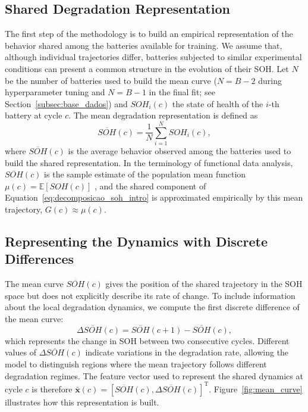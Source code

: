 \documentclass[conference]{IEEEtran}
\begin{document}


\subsection{Shared Degradation Representation}
\label{subsec:representacao_compartilhada}

The first step of the methodology is to build an empirical representation of the behavior shared among the batteries available for training. We assume that, although individual trajectories differ, batteries subjected to similar experimental conditions can present a common structure in the evolution of their SOH. Let $N$ be the number of batteries used to build the mean curve ($N=B-2$ during hyperparameter tuning and $N=B-1$ in the final fit; see Section~\ref{subsec:base_dados}) and $SOH_i(c)$ the state of health of the $i$-th battery at cycle $c$. The mean degradation representation is defined as
\begin{equation}
    \overline{SOH}(c)
    =
    \frac{1}{N}
    \sum_{i=1}^{N}
    SOH_i(c),
    \label{eq:mean_soh}
\end{equation}
where $\overline{SOH}(c)$ is the average behavior observed among the batteries used to build the shared representation. In the terminology of functional data analysis, $\overline{SOH}(c)$ is the sample estimate of the population mean function $\mu(c)=\mathbb{E}[SOH(c)]$ \cite{yao2005functional}, and the shared component of Equation~\eqref{eq:decomposicao_soh_intro} is approximated empirically by this mean trajectory, $G(c) \approx \mu(c)$.

\subsection{Representing the Dynamics with Discrete Differences}
\label{subsec:diferencas_discretas}

The mean curve $\overline{SOH}(c)$ gives the position of the shared trajectory in the SOH space but does not explicitly describe its rate of change. To include information about the local degradation dynamics, we compute the first discrete difference of the mean curve:
\begin{equation}
    \Delta \overline{SOH}(c)
    =
    \overline{SOH}(c+1)-\overline{SOH}(c),
    \label{eq:first_difference}
\end{equation}
which represents the change in SOH between two consecutive cycles. Different values of $\Delta\overline{SOH}(c)$ indicate variations in the degradation rate, allowing the model to distinguish regions where the mean trajectory follows different degradation regimes.
The feature vector used to represent the shared dynamics at cycle $c$ is therefore $\mathbf{\bar{x}}(c)=[\overline{SOH}(c),\Delta\overline{SOH}(c)]^{\mathrm{T}}$.
Figure~\ref{fig:mean_curve} illustrates how this representation is built.
\end{document}
